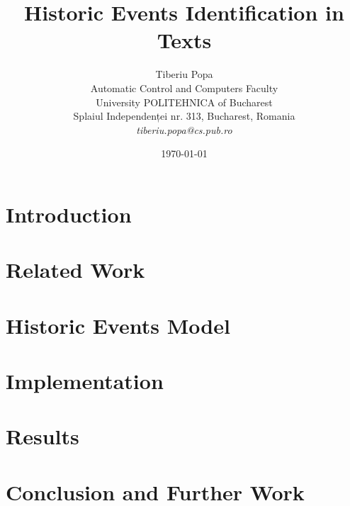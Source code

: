 \documentclass[12pt]{article}
\title{Historic Events Identification in Texts}
\author{Tiberiu Popa\\
Automatic Control and Computers Faculty\\
University POLITEHNICA of Bucharest\\
Splaiul Independenței nr. 313, Bucharest, Romania \\
\emph{tiberiu.popa@cs.pub.ro}}
\date{\today}
\begin{document}
\maketitle

\begin{abstract}

\end{abstract}

\section{Introduction}
\label{sec:introduction}


\section{Related Work}
\label{sec:relatedwork}


\section{Historic Events Model}
\label{sec:model}


\section{Implementation}
\label{sec:implementation}


\section{Results}
\label{sec:results}


\section{Conclusion and Further Work}
\label{sec:conclusion}




\end{document}
